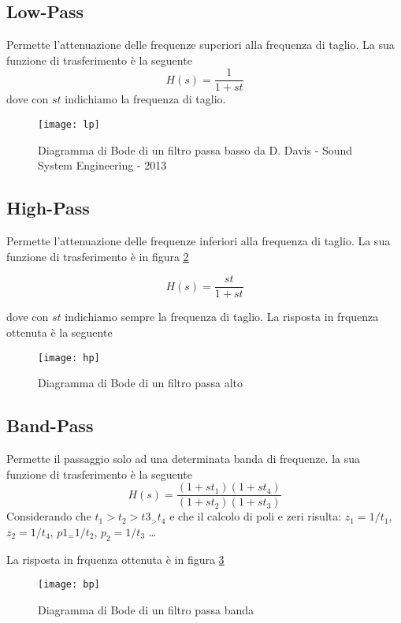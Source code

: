 \subsection{Low-Pass}
Permette l’attenuazione delle frequenze superiori alla frequenza di taglio.
La sua funzione di trasferimento è la seguente
\begin{equation}
H(s)=\frac{1}{1+st}
\end{equation}
dove con $st$ indichiamo la frequenza di taglio.

\begin{figure}[h]
\centering
\texttt{[image: lp]}
\caption{Diagramma di Bode di un filtro passa basso \newline \scriptsize{ da D. Davis - Sound System Engineering - 2013}}
\label{fig:lp}
\end{figure}

\subsection{High-Pass}
Permette l’attenuazione delle frequenze inferiori alla frequenza di taglio.
La sua funzione di trasferimento è in figura \ref{fig:hp}

\begin{equation}
H(s)=\frac{st}{1+st}
\end{equation}

dove con $st$ indichiamo sempre la frequenza di taglio.
La risposta in frquenza ottenuta è la seguente
\begin{figure}[htp]
\centering
\texttt{[image: hp]}
\caption{Diagramma di Bode di un filtro passa alto}
\label{fig:hp}
\end{figure}

\subsection{Band-Pass}
Permette il passaggio solo ad una determinata banda di frequenze.
la sua funzione di trasferimento è la seguente
\begin{equation}
H(s)=\frac{(1+st_1)(1+st_4)}{(1+st_2)(1+st_3)}
\end{equation}
Considerando che $t_1>t_2>t3_>t_4$ e che il calcolo di poli e zeri risulta: $z_1=1/t_1$, $z_2=1/t_4$, $p1_=1/t_2$, $p_2=1/t_3$ \dots

La risposta in frquenza ottenuta è in figura \ref{fig:bp}
\begin{figure}[htp]
\centering
\texttt{[image: bp]}
\caption{Diagramma di Bode di un filtro passa banda}
\label{fig:bp}
\end{figure}



